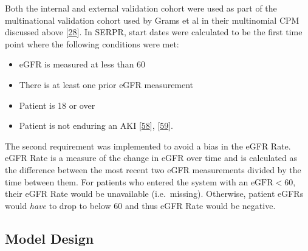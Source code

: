 \documentclass[
]{article}
\providecommand{\tightlist}{%
  \setlength{\itemsep}{0pt}\setlength{\parskip}{0pt}}
\begin{document}
Both the internal and external validation cohort were used as part of the multinational validation cohort used by Grams et al in their multinomial CPM discussed above {[}\protect\hyperlink{ref-grams_predicting_2018}{28}{]}. In SERPR, start dates were calculated to be the first time point where the following conditions were met:
\begin{itemize}
\tightlist
\item
  eGFR is measured at less than 60
\item
  There is at least one prior eGFR measurement
\item
  Patient is 18 or over
\item
  Patient is not enduring an AKI {[}\protect\hyperlink{ref-forni_renal_2017-1}{58}{]}, {[}\protect\hyperlink{ref-noauthor_kdigo_2012}{59}{]}.
\end{itemize}
The second requirement was implemented to avoid a bias in the eGFR Rate. eGFR Rate is a measure of the change in eGFR over time and is calculated as the difference between the most recent two eGFR measurements divided by the time between them. For patients who entered the system with an \(\textrm{eGFR} < 60\), their eGFR Rate would be unavailable (i.e.~missing). Otherwise, patient eGFRs would \emph{have} to drop to below 60 and thus eGFR Rate would be negative.

\hypertarget{model-design}{%
\subsection{Model Design}\label{model-design}}
\end{document}
